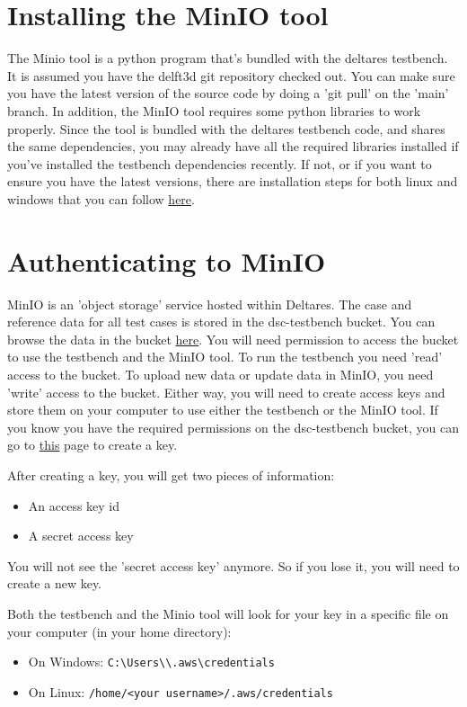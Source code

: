 \documentclass{deltares_memo}
\begin{document}
\section{Installing the MinIO tool}
The Minio tool is a python program that's bundled with the deltares testbench. It is assumed you have the delft3d git repository checked out. You can make sure you have the latest version of the source code by doing a 'git pull' on the 'main' branch. In addition, the MinIO tool requires some python libraries to work properly. Since the tool is bundled with the deltares testbench code, and shares the same dependencies, you may already have all the required libraries installed if you've installed the testbench dependencies recently. If not, or if you want to ensure you have the latest versions, there are installation steps for both linux and windows that you can follow \href{https://github.com/Deltares/Delft3D/tree/main/test/deltares_testbench}{here}.

\section{Authenticating to MinIO}
MinIO is an 'object storage' service hosted within Deltares. The case and reference data for all test cases is stored in the dsc-testbench bucket. You can browse the data in the bucket \href{https://s3-console.deltares.nl/browser/dsc-testbench}{here}. You will need permission to access the bucket to use the testbench and the MinIO tool. To run the testbench you need 'read' access to the bucket. To upload new data or update data in MinIO, you need 'write' access to the bucket. Either way, you will need to create access keys and store them on your computer to use either the testbench or the MinIO tool. If you know you have the required permissions on the dsc-testbench bucket, you can go to \href{https://s3-console.deltares.nl/access-keys}{this} page to create a key.

After creating a key, you will get two pieces of information:
\newline
\begin{itemize}
	\item An access key id
	\item A secret access key
\end{itemize}
You will not see the 'secret access key' anymore. So if you lose it, you will need to create a new key.

Both the testbench and the Minio tool will look for your key in a specific file on your computer (in your home directory):
\newline
\begin{itemize}
	\item On Windows: \texttt{C:\textbackslash Users\textbackslash <your username>\textbackslash .aws\textbackslash credentials}
	\item On Linux: \texttt{/home/<your username>/.aws/credentials}
\end{itemize}
\end{document}
